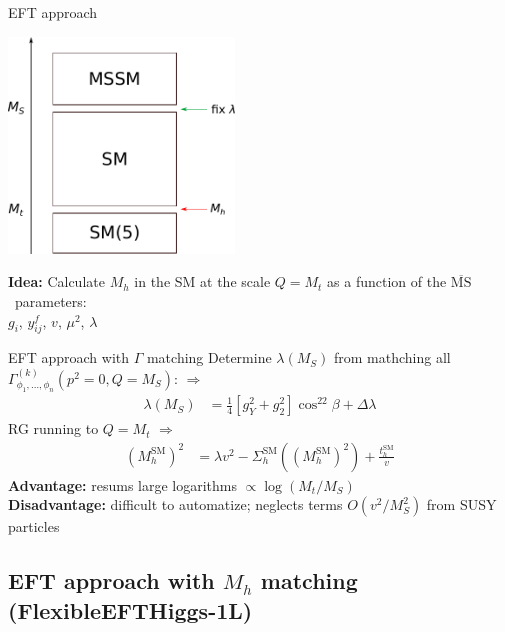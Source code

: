 \documentclass[hyperref={pdfpagelabels=false},ngerman]{beamer}
\renewcommand{\emph}{\textbf}
\newcommand{\MSbar}{\ensuremath{\overline{\text{MS}}}}
\newcommand{\SM}{\ensuremath{\text{SM}}}
\begin{document}
\begin{frame}{EFT approach}
  \begin{center}
    \includegraphics[width=0.45\textwidth]{images/mssm-sm-tower-eft}\\[1em]
  \end{center}
  \emph{Idea:} Calculate $M_h$ in the SM at the scale $Q = M_t$ as a function of the \MSbar\ parameters:\\[1em]
  \centering $g_i$, $y^f_{ij}$, $v$, $\mu^2$, $\lambda$
\end{frame}


\begin{frame}{EFT approach with $\Gamma$ matching}
  Determine $\lambda(M_S)$ from mathching all
  $\Gamma_{\phi_1,\ldots,\phi_n}^{(k)}(p^2 = 0, Q = M_S)$: $\Rightarrow$
  \begin{align*}
    \lambda (M_S) &= \frac{1}{4}\left[g_Y^{2} + g_2^2\right] \cos^22\beta
    + \Delta \lambda
  \end{align*}
  RG running to $Q=M_t$ $\Rightarrow$
  \begin{align*}
    (M_h^\SM)^2 &= \lambda v^2 - \Sigma^\SM_h((M_h^\SM)^2) + \frac{t_h^\SM}{v}
  \end{align*}
  \emph{Advantage:} resums large logarithms $\propto\log(M_t/M_S)$\\
  \emph{Disadvantage:} difficult to automatize; neglects terms
  $O(v^2/M_S^2)$ from SUSY particles
\end{frame}


\subsection{EFT approach with $M_h$ matching (FlexibleEFTHiggs-1L)}
\end{document}
